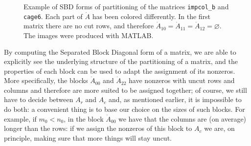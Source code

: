 \begin{figure}[h]
	\caption{Example of SBD forms of partitioning of the matrices \texttt{impcol\_b}\cite{matrixmarket} and \texttt{cage6}\cite{ufl}. Each part of $\dot{A}$ has been colored differently. In the first matrix there are no cut rows, and therefore $\dot{A}_{10}=\dot{A}_{11} =\dot{A}_{12} = \varnothing$. The images were produced with MATLAB.} \label{fig:sbd-2}
\end{figure}

By computing the Separated Block Diagonal form of a matrix, we are able to explicitly see the underlying structure of the partitioning of a matrix, and the properties of each block can be used to adapt the assignment of its nonzeros. More specifically, the blocks $\dot{A}_{00}$ and $\dot{A}_{22}$ have nonzeros with uncut rows and columns and therefore are more suited to be assigned together; of course, we still have to decide between $A_r$ and $A_c$ and, as mentioned earlier, it is impossible to do both: a convenient thing is to base our choice on the sizes of such blocks. For example, if $m_0 < n_0$, in the block $\dot{A}_{00}$ we have that the columns are (on average) longer than the rows: if we assign the nonzeros of this block to $A_c$ we are, on principle, making sure that more things will stay uncut.

